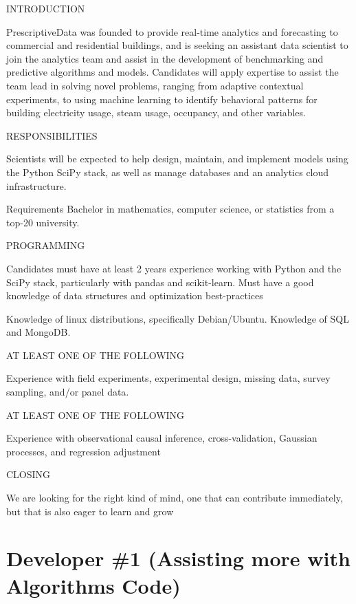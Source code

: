 \documentclass[12pt]{article}
\author{David Karapetyan}
\begin{document}
INTRODUCTION

PrescriptiveData was founded to provide real-time analytics and forecasting to
commercial and residential buildings, and is seeking an assistant data scientist
to join the analytics team and assist in the development of benchmarking and
predictive algorithms and models. Candidates will apply expertise to assist the
team lead in solving novel problems, ranging from adaptive contextual
experiments, to using machine learning to identify behavioral patterns for
building electricity usage, steam usage, occupancy, and other variables. 

RESPONSIBILITIES

Scientists will be expected to help design, maintain, and implement models using the
Python SciPy stack, as well as manage databases and an analytics cloud
infrastructure. 

Requirements
Bachelor in mathematics, computer science, or statistics from a top-20
university. 

PROGRAMMING

Candidates must have at least 2 years experience working with Python and the
SciPy stack, particularly with pandas and scikit-learn. Must have a good
knowledge of data structures and optimization best-practices

Knowledge of linux distributions, specifically Debian/Ubuntu. Knowledge of SQL
and MongoDB.

AT LEAST ONE OF THE FOLLOWING

Experience with field experiments, experimental design, missing data, survey sampling, and/or panel data.

AT LEAST ONE OF THE FOLLOWING

Experience with observational causal inference, cross-validation, Gaussian
processes, and regression adjustment

CLOSING

We are looking for the right kind of mind, one that can contribute immediately, but
that is also eager to learn and grow


\section{Developer \#1 (Assisting more with Algorithms Code)}
\end{document}
